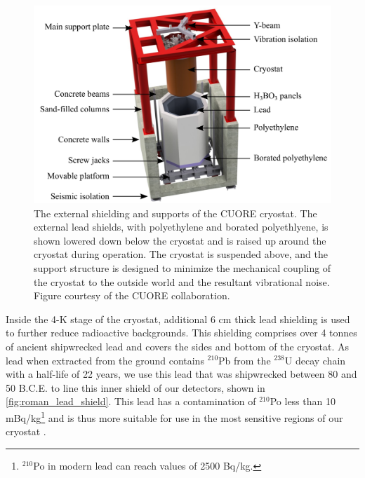 \begin{figure}
    \centering
    \includegraphics[width=\linewidth]{Figures/Hut_ShieldingDown_02.pdf}
    \caption[The external shielding and supports of the CUORE cryostat]
    {The external shielding and supports of the CUORE cryostat.
    The external lead shields, with polyethylene and borated polyethlyene, is shown lowered down below the cryostat and is raised up around the cryostat during operation.
    The cryostat is suspended above, and the support structure is designed to minimize the mechanical coupling of the cryostat to the outside world and the resultant vibrational noise.
    Figure courtesy of the CUORE collaboration.}
    \label{fig:external_shielding}
\end{figure}
Inside the 4-K stage of the cryostat, additional 6 cm thick lead shielding is used to further reduce radioactive backgrounds. This shielding comprises over 4 tonnes of ancient shipwrecked lead \cite{roman_lead} and covers the sides and bottom of the cryostat.
As lead when extracted from the ground contains $^{210}$Pb from the $^{238}$U decay chain with a half-life of 22 years, we use this lead that was shipwrecked between 80 and 50 B.C.E. to line this inner shield of our detectors, shown in \autoref{fig:roman_lead_shield}.
This lead has a contamination of $^{210}$Po less than 10 mBq/kg\footnote{$^{210}$Po in modern lead can reach values of 2500 Bq/kg.} and is thus more suitable for use in the most sensitive regions of our cryostat \cite{ALESSANDRELLO1998163}.  
